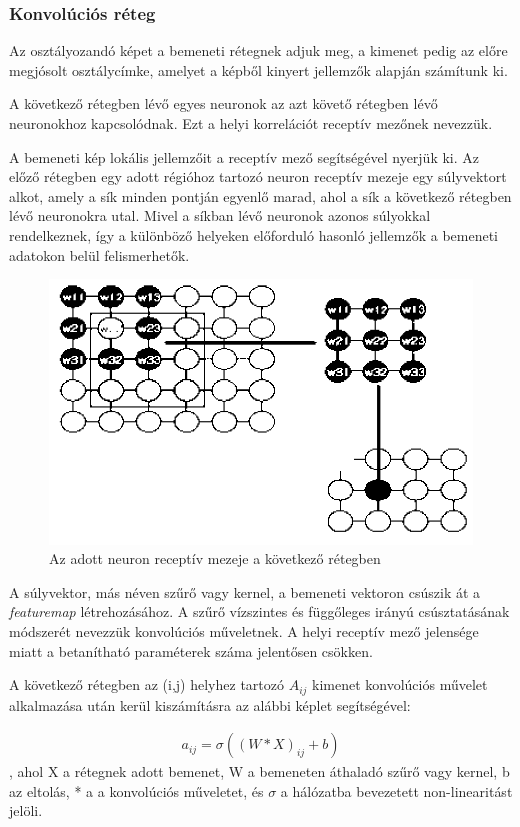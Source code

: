 \documentclass[12pt,a4]{article}
\begin{document}
	
	\subsubsection{Konvolúciós réteg}
	
	\cite{CNN}Az osztályozandó képet a bemeneti rétegnek adjuk meg, a kimenet pedig az előre megjósolt osztálycímke, amelyet a képből kinyert jellemzők alapján számítunk ki.
	
	
	A következő rétegben lévő egyes neuronok az azt követő rétegben lévő neuronokhoz kapcsolódnak. Ezt a helyi korrelációt receptív mezőnek nevezzük.
	
	
	A bemeneti kép lokális jellemzőit a receptív mező segítségével nyerjük ki. Az előző rétegben egy adott régióhoz tartozó neuron receptív mezeje egy súlyvektort alkot, amely a sík minden pontján egyenlő marad, ahol a sík a következő rétegben lévő neuronokra utal. Mivel a síkban lévő neuronok azonos súlyokkal rendelkeznek, így a különböző helyeken előforduló hasonló jellemzők a bemeneti adatokon belül felismerhetők.
	
	\begin{figure}[h]	
		\centering
		\includegraphics[width=0.7\linewidth]{receptiv}
		\caption{\cite{CNN} Az adott neuron receptív mezeje a következő rétegben}
	\end{figure}
		\newpage
	A súlyvektor, más néven szűrő vagy kernel, a bemeneti vektoron csúszik át a \textit{featuremap} létrehozásához.
	A szűrő vízszintes és függőleges irányú csúsztatásának módszerét nevezzük konvolúciós műveletnek. A helyi receptív mező jelensége miatt a betanítható paraméterek száma jelentősen csökken.
	
	A következő rétegben az (i,j) helyhez tartozó $A_{ij}$ kimenet konvolúciós
	művelet alkalmazása után kerül kiszámításra az alábbi képlet segítségével:
	\begin{mdframed}
	\begin{align}
		a_{ij} = \sigma((W * X)_{ij} + b)
	\end{align}
	, ahol X a rétegnek adott bemenet, W a bemeneten áthaladó szűrő vagy kernel,
	b az eltolás, * a 
	a konvolúciós műveletet, és $\sigma$ a hálózatba bevezetett non-linearitást jelöli.
	\end{mdframed}
	
\end{document}
